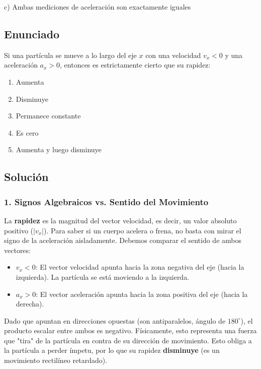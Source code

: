 \documentclass[12pt, a4paper]{article}
\begin{document}
\begin{tcolorbox}[colback=green!5!white, colframe=green!50!black, title=Respuesta Final]
\centering \Large c) Ambas mediciones de aceleración son exactamente iguales
\end{tcolorbox}

\newpage

\subsection*{Enunciado}
Si una partícula se mueve a lo largo del eje $x$ con una velocidad $v_x < 0$ y una aceleración $a_x > 0$, entonces es estrictamente cierto que su rapidez:
\begin{enumerate}[label=\alph*)]
    \item Aumenta
    \item Disminuye
    \item Permanece constante
    \item Es cero
    \item Aumenta y luego disminuye
\end{enumerate}

\subsection*{Solución}

\subsubsection*{1. Signos Algebraicos vs. Sentido del Movimiento}
La \textbf{rapidez} es la magnitud del vector velocidad, es decir, un valor absoluto positivo ($|v_x|$).
Para saber si un cuerpo acelera o frena, no basta con mirar el signo de la aceleración aisladamente. Debemos comparar el sentido de ambos vectores:
\begin{itemize}
    \item $v_x < 0$: El vector velocidad apunta hacia la zona negativa del eje (hacia la izquierda). La partícula se está moviendo a la izquierda.
    \item $a_x > 0$: El vector aceleración apunta hacia la zona positiva del eje (hacia la derecha). 
\end{itemize}
Dado que apuntan en direcciones opuestas (son antiparalelos, ángulo de $180^\circ$), el producto escalar entre ambos es negativo. Físicamente, esto representa una fuerza que "tira" de la partícula en contra de su dirección de movimiento. Esto obliga a la partícula a perder ímpetu, por lo que su rapidez \textbf{disminuye} (es un movimiento rectilíneo retardado).
\end{document}
